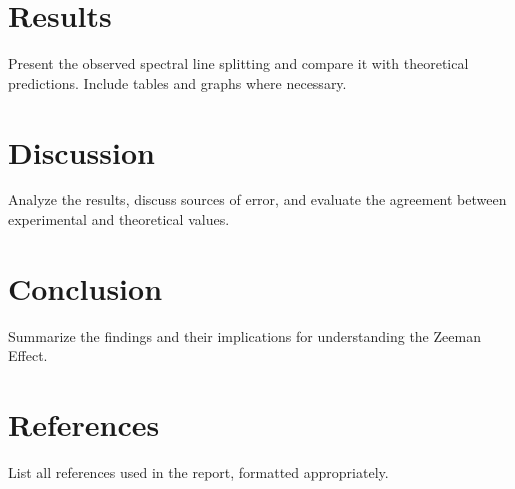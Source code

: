 \documentclass[a4paper,12pt]{article}
\begin{document}
\section{Results}
Present the observed spectral line splitting and compare it with theoretical predictions. Include tables and graphs where necessary.

\section{Discussion}
Analyze the results, discuss sources of error, and evaluate the agreement between experimental and theoretical values.

\section{Conclusion}
Summarize the findings and their implications for understanding the Zeeman Effect.

\section*{References}
List all references used in the report, formatted appropriately.
\end{document}
